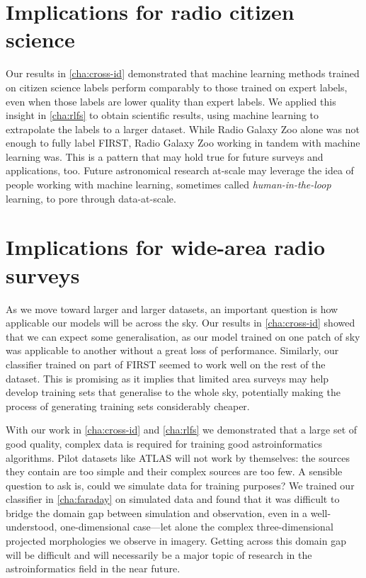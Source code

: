 \documentclass[11pt, a4paper]{book}
\newcommand{\defn}[1]{\emph{#1}}
\begin{document}
\section{Implications for radio citizen science}
\label{sec:implications-citizen-science}

    Our results in \autoref{cha:cross-id} demonstrated that machine learning methods trained on citizen science labels perform comparably to those trained on expert labels, even when those labels are lower quality than expert labels. We applied this insight in \autoref{cha:rlfs} to obtain scientific results, using machine learning to extrapolate the labels to a larger dataset. While Radio Galaxy Zoo alone was not enough to fully label FIRST, Radio Galaxy Zoo working in tandem with machine learning was. This is a pattern that may hold true for future surveys and applications, too. Future astronomical research at-scale may leverage the idea of people working with machine learning, sometimes called \defn{human-in-the-loop} \citep[e.g.][]{holzinger_interactive_2016} learning, to pore through data-at-scale.

\section{Implications for wide-area radio surveys}
\label{sec:implications-wide-area-radio-surveys}

    As we move toward larger and larger datasets, an important question is how applicable our models will be across the sky. Our results in \autoref{cha:cross-id} showed that we can expect some generalisation, as our model trained on one patch of sky was applicable to another without a great loss of performance. Similarly, our classifier trained on part of FIRST seemed to work well on the rest of the dataset. This is promising as it implies that limited area surveys may help develop training sets that generalise to the whole sky, potentially making the process of generating training sets considerably cheaper.

    With our work in \autoref{cha:cross-id} and \ref{cha:rlfs} we demonstrated that a large set of good quality, complex data is required for training good astroinformatics algorithms. Pilot datasets like ATLAS will not work by themselves: the sources they contain are too simple and their complex sources are too few. A sensible question to ask is, could we simulate data for training purposes? We trained our classifier in \autoref{cha:faraday} on simulated data and found that it was difficult to bridge the domain gap between simulation and observation, even in a well-understood, one-dimensional case---let alone the complex three-dimensional projected morphologies we observe in imagery. Getting across this domain gap will be difficult and will necessarily be a major topic of research in the astroinformatics field in the near future.
\end{document}
